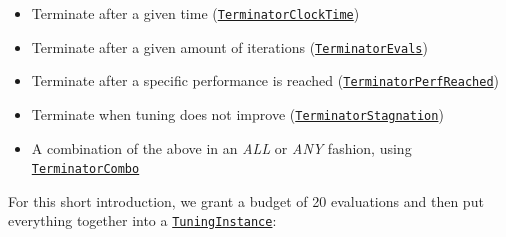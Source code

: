 \documentclass[]{article}
\newenvironment{Shaded}{}{}
\newcommand{\DataTypeTok}[1]{#1}
\newcommand{\DecValTok}[1]{#1}
\newcommand{\KeywordTok}[1]{\textcolor[rgb]{0.00,0.00,1.00}{#1}}
\newcommand{\NormalTok}[1]{#1}
\newcommand{\OperatorTok}[1]{#1}
\newcommand{\StringTok}[1]{\textcolor[rgb]{0.00,0.50,0.50}{#1}}
\providecommand{\tightlist}{%
  \setlength{\itemsep}{0pt}\setlength{\parskip}{0pt}}
\renewenvironment{Shaded} {\begin{snugshade}\small} {\end{snugshade}}
\begin{document}
\begin{itemize}
\tightlist
\item
  Terminate after a given time (\href{https://mlr3tuning.mlr-org.com/reference/mlr_terminators_clock_time.html}{\texttt{TerminatorClockTime}})
\item
  Terminate after a given amount of iterations (\href{https://mlr3tuning.mlr-org.com/reference/mlr_terminators_evals.html}{\texttt{TerminatorEvals}})
\item
  Terminate after a specific performance is reached (\href{https://mlr3tuning.mlr-org.com/reference/mlr_terminators_perf_reached.html}{\texttt{TerminatorPerfReached}})
\item
  Terminate when tuning does not improve (\href{https://mlr3tuning.mlr-org.com/reference/mlr_terminators_stagnation.html}{\texttt{TerminatorStagnation}})
\item
  A combination of the above in an \emph{ALL} or \emph{ANY} fashion, using \href{https://mlr3tuning.mlr-org.com/reference/mlr_terminators_combo.html}{\texttt{TerminatorCombo}}
\end{itemize}

For this short introduction, we grant a budget of 20 evaluations and then put everything together into a \href{https://mlr3tuning.mlr-org.com/reference/TuningInstance.html}{\texttt{TuningInstance}}:

\begin{Shaded}
\end{Shaded}
\end{document}
